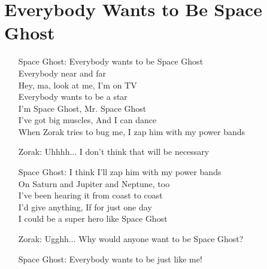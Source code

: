 \chapter{Everybody Wants to Be Space Ghost\label{app:b}}

\begin{itemize}
\item[Space Ghost:]
Everybody wants to be Space Ghost\\ 
Everybody near and far\\
Hey, ma, look at me, I'm on TV\\
Everybody wants to be a star\\
I'm Space Ghost, Mr. Space Ghost\\
I've got big muscles, And I can dance\\
When Zorak tries to bug me, I zap him with my power bands
\item[Zorak:]
Uhhhh$\ldots$ I don't think that will be necessary
\item[Space Ghost:]
I think I'll zap him with my power bands\\
On Saturn and Jupiter and Neptune, too\\
I've been hearing it from coast to coast\\
I'd give anything, If for just one day\\
I could be a super hero like Space Ghost
\item[Zorak:]
Ugghh$\ldots$ Why would anyone want to be Space Ghost?
\item[Space Ghost:]
Everybody wants to be just like me!
\end{itemize}




